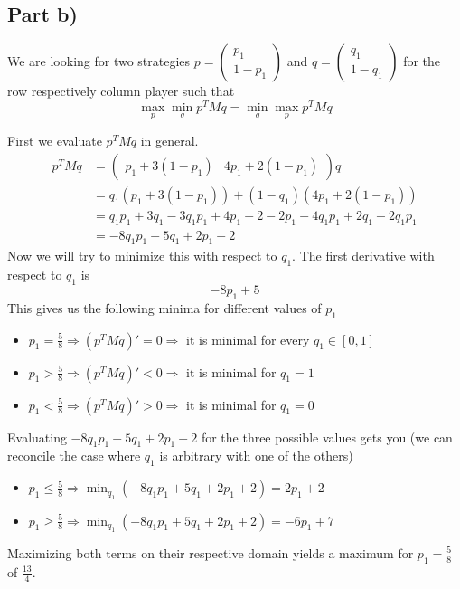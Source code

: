 \documentclass[10pt,a4paper]{article}
\begin{document}
\subsection*{Part b)}

We are looking for two strategies $p = \begin{pmatrix}
  p_{1}\\1 - p_{1}
\end{pmatrix}$ and $q = \begin{pmatrix}
  q_{1}\\1 - q_{1}
\end{pmatrix}$ for the row respectively column player such that
\begin{equation*}
  \max_{p} \min_{q} p^{T}Mq = \min_{q} \max_{p} p^{T}Mq
\end{equation*}

First we evaluate $p^{T}Mq$ in general.
\begin{align*}
  p^{T}Mq & = \begin{pmatrix}
    p_{1} + 3(1 - p_{1}) & 4p_{1} + 2(1 - p_{1})
  \end{pmatrix}q\\
          & = q_{1}(p_{1} + 3(1 - p_{1})) + (1 - q_{1})(4p_{1} + 2(1 - p_{1}))\\
          & = q_{1}p_{1} + 3q_{1} - 3q_{1}p_{1} + 4p_{1} + 2 - 2p_{1} - 4q_{1}p_{1} + 2q_{1} - 2q_{1}p_{1}\\
          & = -8q_{1}p_{1} + 5q_{1} + 2p_{1} + 2
\end{align*}
Now we will try to minimize this with respect to $q_{1}$.
The first derivative with respect to $q_{1}$ is
\begin{equation*}
  -8p_{1} + 5
\end{equation*}
This gives us the following minima for different values of $p_{1}$
\begin{itemize}
\item $p_{1} = \frac{5}{8} \Rightarrow (p^{T}Mq)' = 0 \Rightarrow $ it is minimal for every $q_{1} \in [0, 1]$
\item $p_{1} > \frac{5}{8} \Rightarrow (p^{T}Mq)' < 0 \Rightarrow $ it is minimal for $q_{1} = 1$
\item $p_{1} < \frac{5}{8} \Rightarrow (p^{T}Mq)' > 0 \Rightarrow $ it is minimal for $q_{1} = 0$
\end{itemize}
Evaluating $-8q_{1}p_{1} + 5q_{1} + 2p_{1} + 2$ for the three possible values gets you (we can reconcile the case where $q_{1}$ is arbitrary with one of the others)
\begin{itemize}
\item $p_{1} \le \frac{5}{8} \Rightarrow \min_{q_{1}}(-8q_{1}p_{1} + 5q_{1} + 2p_{1} + 2) = 2p_{1} + 2$
\item $p_{1} \ge \frac{5}{8} \Rightarrow \min_{q_{1}}(-8q_{1}p_{1} + 5q_{1} + 2p_{1} + 2) = -6p_{1} + 7$
\end{itemize}
Maximizing both terms on their respective domain yields a maximum for $p_{1} = \frac{5}{8}$ of $\frac{13}{4}$.
\end{document}
